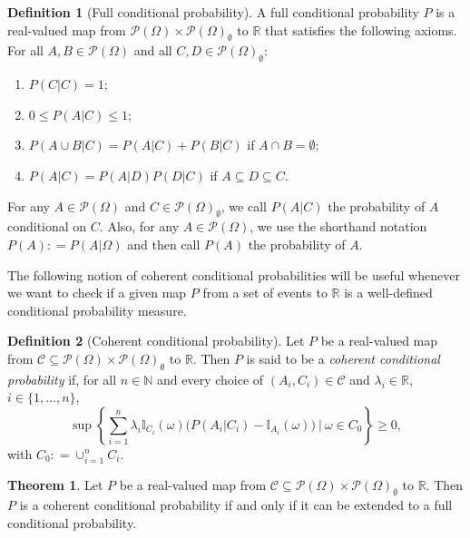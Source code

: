 \documentclass[10pt]{paper}
\theoremstyle{definition}
\newtheorem{theorem}{Theorem}
\newtheorem{definition}{Definition}
\newcommand{\reals}{\mathbb{R}}
\newcommand{\paths}{\Omega}
\newcommand{\power}{\mathcal{P}(\paths)}
\newcommand{\nonemptypower}{\power_{\emptyset}}
\newcommand{\ind}[1]{\mathbb{I}_{#1}}
\newcommand{\coloneqq}{:\!=}
\begin{document}
\begin{definition}[Full conditional probability]\label{def:cond_prob}
A full conditional probability $P$ is a real-valued map from $\power\times\nonemptypower$ to $\reals$ that satisfies the following axioms. For all $A,B\in\power$ and all \mbox{$C,D\in\nonemptypower$}:
\vspace{5pt}

\begin{enumerate}[label=F\arabic*:,ref=F\arabic*]
\item
$P(C\vert C)=1$;\label{def:coh_prob_1}
\item
$0\leq P(A\vert C)\leq 1$;\label{def:coh_prob_2}
\item
$P(A\cup B\vert C)=P(A\vert C)+P(B\vert C)$ if $A\cap B=\emptyset$;\label{def:coh_prob_3}
\item
$P(A\vert C)=P(A\vert D)P(D\vert C)$ if $A\subseteq D\subseteq C$.\label{def:coh_prob_4}
\end{enumerate}
\vspace{5pt}

\noindent
For any $A\in\power$ and $C\in\nonemptypower$, we call $P(A\vert C)$ the probability of $A$ conditional on $C$. Also, for any $A\in\power$, we use the shorthand notation $P(A)\coloneqq P(A\vert\paths)$ and then call $P(A)$ the probability of $A$.
\end{definition}

The following notion of coherent conditional probabilities will be useful whenever we want to check if a given map $P$ from a set of events to $\reals$ is a well-defined conditional probability measure.

\begin{definition}[Coherent conditional probability]\label{def:coherence}
Let $P$ be a real-valued map from $\mathcal{C}\subseteq\power\times\nonemptypower$ to $\reals$. Then $P$ is said to be a \emph{coherent conditional probability} if, for all $n\in\mathbb{N}$ and every choice of $(A_i,C_i)\in\mathcal{C}$ and $\lambda_i\in\reals$, $i\in\{1,\dots,n\}$,
\begin{equation*}
\sup\left\{\sum_{i=1}^n\lambda_i\ind{C_i}(\omega)\bigl(P(A_i\vert C_i)-\ind{A_i}(\omega)\bigr)~\Bigg\vert~\omega\in C_0\right\}\geq0,
\end{equation*}
with $C_0\coloneqq\cup_{i=1}^nC_i$.
\end{definition}

\begin{theorem}\label{theo:coherentextendable}
Let $P$ be a real-valued map from $\mathcal{C}\subseteq\power\times\nonemptypower$ to $\reals$. Then $P$ is a coherent conditional probability if and only if it can be extended to a full conditional probability.
\end{theorem}
\end{document}
